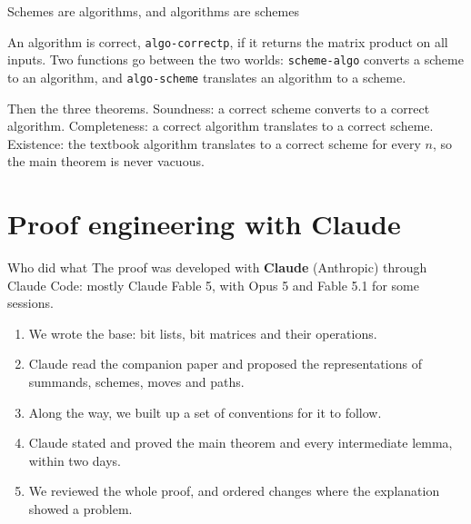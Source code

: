 \documentclass[aspectratio=169,10pt]{beamer}
\newcommand{\code}[1]{\texttt{#1}}
\begin{document}
\begin{frame}[fragile]{Schemes are algorithms, and algorithms are schemes}
{    An algorithm is correct, \code{algo-correctp}, if it returns the
    matrix product on all inputs. Two functions go between the two worlds:
    \code{scheme-algo} converts a scheme to an algorithm, and
    \code{algo-scheme} translates an algorithm to a scheme.

    Then the three theorems. Soundness: a correct scheme converts to a
    correct algorithm. Completeness: a correct algorithm translates to a
    correct scheme. Existence: the textbook algorithm translates to a
    correct scheme for every $n$, so the main theorem is never vacuous.
  }
\end{frame}

\section{Proof engineering with Claude}

\begin{frame}{Who did what}
  The proof was developed with \textbf{Claude} (Anthropic) through Claude
  Code: mostly Claude Fable 5, with Opus 5 and Fable 5.1 for some sessions.
  \vspace{1ex}
  \begin{enumerate}
    \item We wrote the base: bit lists, bit matrices and their
      operations.
    \item Claude read the companion paper and proposed the
      representations of summands, schemes, moves and paths.
    \item Along the way, we built up a set of conventions for it to follow.
    \item Claude stated and proved the main theorem and every
      intermediate lemma, within two days.
    \item We reviewed the whole proof, and
      ordered changes where the explanation showed a problem.
  \end{enumerate}
\end{frame}
\end{document}
